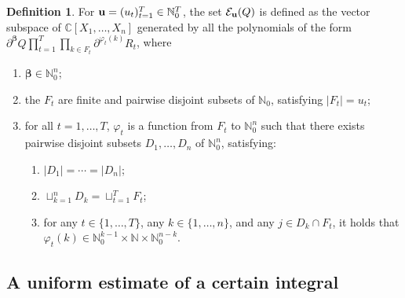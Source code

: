 \documentclass[a4paper,12pt]{article}
\theoremstyle{definition}
\newtheorem{definition}[thm]{Definition}
\numberwithin{equation}{section}
\def\N{{\mathbb N}}
\def\C{{\mathbb C}}
\def\u{{\bf u}}
\newcommand{\betab}{\boldsymbol{\beta}}
\let\ds=\displaystyle
\begin{document}
\begin{definition}\label{EuQ}
For $\u=(u_t)_{t=1}^T \in \N_0^T$, the set $\mathcal E_{\u}(Q)$ is defined as the vector subspace of $\C[X_1,\ldots,X_n]$ generated by all the polynomials of the form $\ds \partial^{\betab} Q \prod_{t=1}^T \prod_{k\in F_t} \partial^{\varphi_t(k)}R_t$, where
\begin{enumerate}
\item $\betab \in \N_0^n$;
\item the $F_t$ are finite and pairwise disjoint subsets of $\N_0$, satisfying $|F_t|=u_t$;
\item for all $t=1,\ldots, T$, $\varphi_t$ is a function from $F_t$ to $\N_0^n$ such that there exists pairwise disjoint subsets $D_1,\ldots, D_n$ of $\N_0^n$,  satisfying:
\begin{enumerate}[label=(\alph*)]
\item $|D_1|=\cdots=|D_n|$;
\item $\sqcup_{k=1}^n D_k = \sqcup_{t=1}^T F_t$;
\item for any $t\in \{1,\ldots,T\}$, any $k\in \{1,\ldots,n\}$, and any $j\in D_k\cap F_t$, it holds that
$\varphi_t(k) \in \N_0^{k-1}\times \N\times \N_0^{n-k}$.
\end{enumerate}
\end{enumerate}
\end{definition}

\subsection{A uniform estimate of a certain integral}
\end{document}
